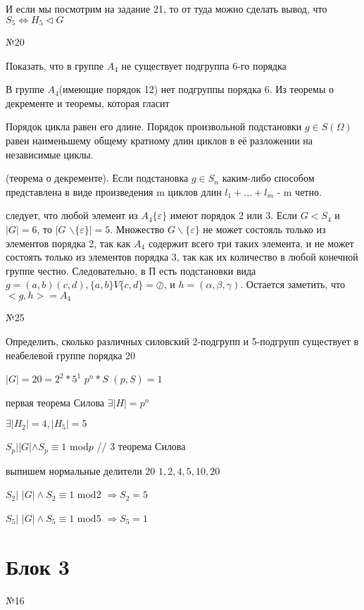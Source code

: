 \documentclass[14pt, letterpaper, twoside]{article}
\begin{document}
И если мы посмотрим на задание 21, то от туда можно сделать вывод, что $S_5 \Leftrightarrow H_5     \triangleleft G$ 
\par
\noindent№20
\par
Показать, что в группе $A_4$ не существует подгруппа 6-го порядка
\par
В группе $A_4$(имеющие порядок 12) нет подгруппы порядка 6. Из теоремы о декременте и теоремы, которая гласит 
\par
Порядок цикла равен его длине. Порядок произвольной подстановки $g  \in S(\Omega)$ равен наименьшему общему кратному длин циклов в её разложении на независимые циклы.
\par
(теорема о декременте). Если подстановка $g \in S_n$ каким-либо способом представлена в виде произведения m циклов длин $l_1 + ... +l_m$ - m четно.
\par
следует, что любой элемент из $A_4\{\varepsilon\}$ имеют порядок 2 или 3. Если $G < S_4$ и $|G| = 6$, то $|G$  $    \backslash\{\varepsilon\}| = 5$. Множество $G\backslash\{\varepsilon\}$ не может состояль только из элементов порядка 2, так как $A_4$ содержит всего три таких элемента, и не может состоять только из элементов порядка 3, так как их количество в любой конечной группе честно. Следовательно, в П есть подстановки вида $g = (a,b)(c,d), \{a,b\} V \{c,d\} = \oslash$, и $h = (\alpha, \beta, \gamma)$. Остается заметить, что $<g,h> = A_4$


  
\noindent№25

Определить, сколько различных силовский 2-подгрупп и 5-подгрупп существует в неабелевой группе порядка 20

$|G| = 20 = 2^2 * 5^1$ $p^n*S$ $(p,S) = 1$

первая теорема Силова $\exists|H| = p^n $ 

$\exists    |H_2| = 4, |H_5| = 5$

$S_p | |G|  \land S_p \equiv 1$ mod$p$ // 3 теорема Силова

выпишем нормальные делители 20 $1,2,4,5,10,20$

$S_2 |$ $|G|    \land S_2 \equiv 1$ mod$2$ $\Rightarrow S_2 = 5$

$S_5 |$ $|G|    \land S_5 \equiv 1$ mod$5$ $\Rightarrow S_5 = 1$

\section{Блок 3}
\noindent№16
\end{document}
